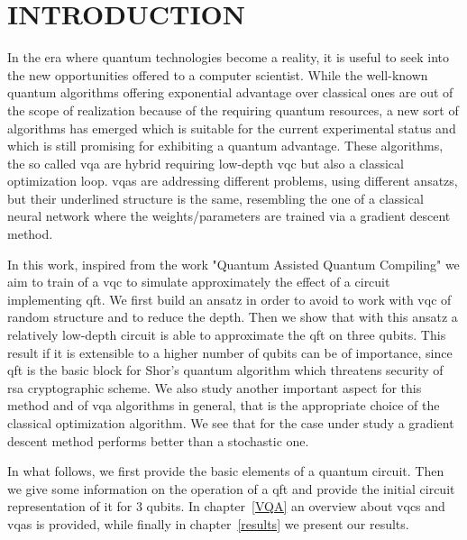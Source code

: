 \documentclass[inscr,ack,preface]{diphdthesis}
\begin{document}
\frontmatter




\mainmatter

\chapter{INTRODUCTION}

In the era where quantum technologies become a reality, it is useful to seek into the 
new opportunities offered to a computer scientist. While the well-known quantum algorithms
offering exponential advantage over classical ones are out of the scope of realization because of
the requiring  quantum resources, a new sort of algorithms  has emerged
which is suitable for the current experimental status and which is still promising for exhibiting a quantum advantage.
These algorithms,  the so called \acrfull{vqa} are hybrid requiring low-depth \acrfull{vqc} but also a classical optimization loop. \acrshort{vqa}s are addressing different problems, using different ansatzs, but their underlined structure
is the same, resembling the one of a classical neural network where the weights/parameters are trained via a gradient descent method. 

In this work, inspired from the work "Quantum Assisted Quantum Compiling"\cite{paper} we aim to train of a \acrshort{vqc} to simulate approximately 
the effect of a circuit implementing \acrfull{qft}. We first build an ansatz in order to avoid to work with \acrshort{vqc} of random structure and to  reduce the depth. Then we show that with this ansatz a relatively low-depth circuit is able to approximate the \acrshort{qft} on three \acrshort{qubit}s. This result if it is extensible to a higher number of \acrshort{qubit}s can be of importance, since \acrshort{qft} is the basic block for Shor's quantum algorithm which threatens security of \acrshort{rsa} cryptographic scheme.
We also study another important aspect for this method and of \acrshort{vqa} algorithms in general, that is the appropriate choice
of the classical optimization algorithm. We see that for the case under study a gradient descent method performs better
than a stochastic one.
 
 In what follows, we first provide the basic elements of a quantum circuit. Then we give some information on
the operation of a \acrshort{qft} and provide the initial circuit representation of it for $3$ \acrshort{qubit}s. In chapter~\ref{VQA} an overview about
\acrshort{vqc}s and \acrshort{vqa}s is provided, while finally in chapter~\ref{results} we present our results.
\end{document}
